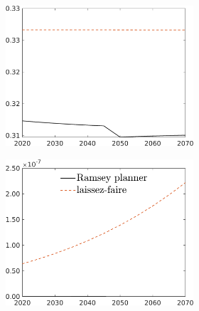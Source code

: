 \begin{figure}[h!!]
\begin{subfigure}{1\textwidth}
\begin{subfigure}[]{0.32\textwidth}
		\end{subfigure}	
		\begin{subfigure}[]{0.32\textwidth}
			\includegraphics[width=1\textwidth]{../../codding_model/own_basedOnFried/optimalPol_010922_revision/figures/all_13Sept22_Tplus30/hl_LFCompOPT_T_NoTaus_regime4_spillover0_noskill0_sep0_xgrowth0_PV1_etaa0.79_lgd0.png}
		\end{subfigure}	
		\begin{subfigure}[]{0.32\textwidth}
			\includegraphics[width=1\textwidth]{../../codding_model/own_basedOnFried/optimalPol_010922_revision/figures/all_13Sept22_Tplus30/sff_LFCompOPT_T_NoTaus_regime4_spillover0_noskill0_sep0_xgrowth0_PV1_etaa0.79_lgd1.png}

\end{subfigure}
\end{subfigure}
\end{figure}
